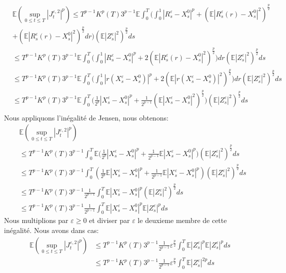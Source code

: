 \documentclass[12pt,a4paper,twoside,fleqn]{book}%
\theoremstyle{definition}
\theoremstyle{lemme}
\numberwithin{equation}{section}
\begin{document}
	\[
\begin{aligned}	
	&\mathbb{E}\left(\sup_{0\leq t \leq T}|J_t^{\varepsilon,2}|^p\right)\leq T^{p-1}K^p(T)3^{p-1}\mathbb{E}\int_{0}^{T}\Big(\int_{0}^{1}|R_s^\varepsilon-X_s^0|^p+(\mathbb{E}|R_s^\varepsilon(r)-X_s^0|^2)^{\frac{p}{2}}\\
	&+\left(\mathbb{E}|R_s^\varepsilon(r)-X_s^0|^2\right)^{\frac{p}{2}}dr\Big)(\mathbb{E}|Z_s^\varepsilon|^2)^{\frac{p}{2}}ds\\
	&\leq  T^{p-1}K^p(T)3^{p-1}\mathbb{E}\int_{0}^{T}\Big(\int_{0}^{1}|R_s^\varepsilon-X_s^0|^p+2(\mathbb{E}|R_s^\varepsilon(r)-X_s^0|^2)^{\frac{p}{2}}\Big)dr(\mathbb{E}|Z_s^\varepsilon|^2)^{\frac{p}{2}}ds\\
	&\leq T^{p-1}K^p(T)3^{p-1}\mathbb{E}\int_{0}^{T}\Big(\int_{0}^{1}|r(X_s^\varepsilon-X_s^0)|^p+2(\mathbb{E}|r(X_s^\varepsilon-X_s^0)|^2)^{\frac{p}{2}}\Big)dr(\mathbb{E}|Z_s^\varepsilon|^2)^{\frac{p}{2}}ds\\
	&\leq T^{p-1}K^p(T)3^{p-1}\mathbb{E}\int_{0}^{T}\Big(\frac{1}{2^p}|X_s^\varepsilon-X_s^0|^p+\frac{1}{2^{p-1}}(\mathbb{E}|X_s^\varepsilon-X_s^0|^2)^{\frac{p}{2}}\Big)(\mathbb{E}|Z_s^\varepsilon|^2)^{\frac{p}{2}}ds\\
\end{aligned}
\]Nous appliquons l'inégalité de Jensen, nous obtenons:
\[
\begin{aligned}
&\mathbb{E}\left(\sup_{0\leq t \leq T}|J_t^{\varepsilon,2}|^p\right)\\&\leq T^{p-1}K^p(T)3^{p-1} \int_{0}^{T}\mathbb{E}\Big(\frac{1}{2^p}|X_s^\varepsilon-X_s^0|^p+\frac{1}{2^{p-1}}\mathbb{E}|X_s^\varepsilon-X_s^0|^p\Big)(\mathbb{E}|Z_s^\varepsilon|^2)^{\frac{p}{2}}ds\\
&\leq T^{p-1}K^p(T)3^{p-1} \int_{0}^{T}\left(\frac{1}{2^p}\mathbb{E}|X_s^\varepsilon-X_s^0|^p+\frac{1}{2^{p-1}}\mathbb{E}|X_s^\varepsilon-X_s^0|^p\right)(\mathbb{E}|Z_s^\varepsilon|^2)^\frac{p}{2}ds\\
&\leq T^{p-1}K^p(T)3^{p-1}\frac{1}{2^{p-1}} \int_{0}^{T} \mathbb{E}|X_s^\varepsilon-X_s^0|^p(\mathbb{E}|Z_s^\varepsilon|^2)^{\frac{p}{2}}ds\\
&\leq T^{p-1}K^p(T)3^{p-1}\frac{1}{2^{p-1}} \int_{0}^{T} \mathbb{E}|X_s^\varepsilon-X_s^0|^p\mathbb{E}|Z_s^\varepsilon|^pds
\end{aligned}
\]
Nous multiplions par $\varepsilon\geq0$ et diviser par $\varepsilon$ le deuxieme membre de cette inégalité. Nous avons dans cas:
\begin{equation}\label{eq:2.2.35}
	\begin{aligned}
\mathbb{E}\left(\sup_{0\leq t \leq T}|J_t^{\varepsilon,2}|^p\right)&\leq T^{p-1}K^p(T)3^{p-1}\frac{1}{2^{p-1}}\varepsilon^{\frac{p}{2}} \int_{0}^{T} \mathbb{E}|Z_s^\varepsilon|^p\mathbb{E}|Z_s^\varepsilon|^pds\\
&\leq  T^{p-1}K^p(T)3^{p-1}\frac{1}{2^{p-1}}\varepsilon^{\frac{p}{2}} \int_{0}^{T} \mathbb{E}|Z_s^\varepsilon|^{2p}ds
\end{aligned}
\end{equation}
\end{document}
